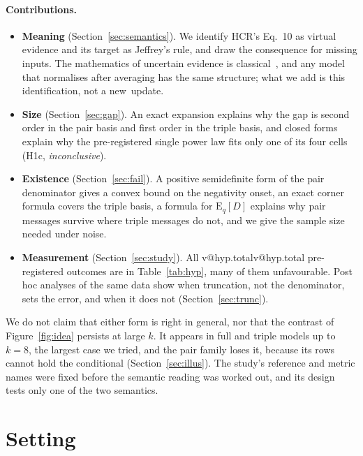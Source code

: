 \documentclass[10pt,a4paper]{article}
\makeatletter
\newcommand{\V}[1]{\ifcsname v@#1\endcsname\csname v@#1\endcsname\else\errmessage{unknown number #1}\fi}
\newcommand{\Eq}{\mathrm{E}_q}
\theoremstyle{upright}
\makeatother
\begin{document}
\paragraph{Contributions.}
\begin{itemize}
\item \textbf{Meaning} (Section~\ref{sec:semantics}). We identify HCR's Eq.~10 as virtual evidence and its target as Jeffrey's rule, and draw the consequence for missing inputs. The mathematics of uncertain evidence is classical~\citep{jeffrey1965logic,pearl1988probabilistic,chan2005revision}, and any model that normalises after averaging has the same structure; what we add is this identification, not a new~update.
\item \textbf{Size} (Section~\ref{sec:gap}). An exact expansion explains why the gap is second order in the pair basis and first order in the triple basis, and closed forms explain why the pre-registered single power law fits only one of its four cells (H1c, \emph{inconclusive}).
\item \textbf{Existence} (Section~\ref{sec:fail}). A positive semidefinite form of the pair denominator gives a convex bound on the negativity onset, an exact corner formula covers the triple basis, a formula for $\Eq[D]$ explains why pair messages survive where triple messages do not, and we give the sample size needed under noise.
\item \textbf{Measurement} (Section~\ref{sec:study}). All \V{hyp.total} pre-registered outcomes are in Table~\ref{tab:hyp}, many of them unfavourable. Post hoc analyses of the same data show when truncation, not the denominator, sets the error, and when it does not (Section~\ref{sec:trunc}).
\end{itemize}

We do not claim that either form is right in general, nor that the contrast of Figure~\ref{fig:idea} persists at large $k$. It appears in full and triple models up to $k=8$, the largest case we tried, and the pair family loses it, because its rows cannot hold the conditional (Section~\ref{sec:illus}). The study's reference and metric names were fixed before the semantic reading was worked out, and its design tests only one of the two semantics.

\section{Setting}\label{sec:setting}
\end{document}
